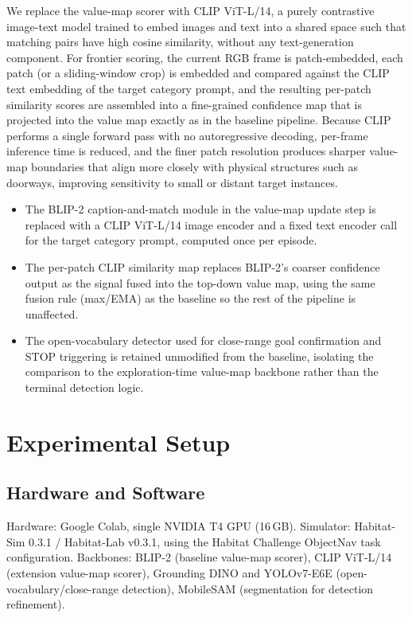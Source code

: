 \documentclass[conference]{IEEEtran}
\begin{document}
We replace the value-map scorer with CLIP ViT-L/14, a purely contrastive image-text model trained to embed images and text into a shared space such that matching pairs have high cosine similarity, without any text-generation component. For frontier scoring, the current RGB frame is patch-embedded, each patch (or a sliding-window crop) is embedded and compared against the CLIP text embedding of the target category prompt, and the resulting per-patch similarity scores are assembled into a fine-grained confidence map that is projected into the value map exactly as in the baseline pipeline. Because CLIP performs a single forward pass with no autoregressive decoding, per-frame inference time is reduced, and the finer patch resolution produces sharper value-map boundaries that align more closely with physical structures such as doorways, improving sensitivity to small or distant target instances.

\begin{itemize}
\item The BLIP-2 caption-and-match module in the value-map update step is replaced with a CLIP ViT-L/14 image encoder and a fixed text encoder call for the target category prompt, computed once per episode.
\item The per-patch CLIP similarity map replaces BLIP-2's coarser confidence output as the signal fused into the top-down value map, using the same fusion rule (max/EMA) as the baseline so the rest of the pipeline is unaffected.
\item The open-vocabulary detector used for close-range goal confirmation and STOP triggering is retained unmodified from the baseline, isolating the comparison to the exploration-time value-map backbone rather than the terminal detection logic.
\end{itemize}

\section{Experimental Setup}

\subsection{Hardware and Software}
Hardware: Google Colab, single NVIDIA T4 GPU (16\,GB). Simulator: Habitat-Sim 0.3.1 / Habitat-Lab v0.3.1, using the Habitat Challenge ObjectNav task configuration. Backbones: BLIP-2 (baseline value-map scorer), CLIP ViT-L/14 (extension value-map scorer), Grounding DINO and YOLOv7-E6E (open-vocabulary/close-range detection), MobileSAM (segmentation for detection refinement).
\end{document}
